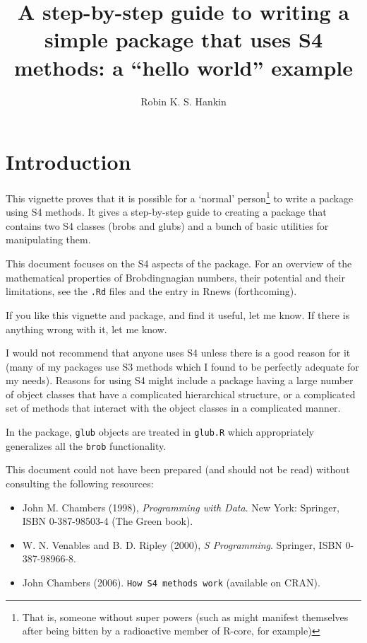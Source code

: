 \documentclass[a4paper]{article}
\author{Robin K. S. Hankin}
\title{A step-by-step guide to writing a simple package that uses S4 methods: a ``hello world'' example}
\begin{document}
\maketitle

\section{Introduction}

This vignette proves that it is possible for a `normal'
person\footnote{That is, someone without super powers (such as might
manifest themselves after being bitten by a radioactive member of
R-core, for example)} to write a package using S4 methods.  It gives a
step-by-step guide to creating a package that contains two S4 classes
(brobs and glubs) and a bunch of basic utilities for manipulating
them.

This document focuses on the S4 aspects of the package.  For an
overview of the mathematical properties of Brobdingnagian numbers,
their potential and their limitations, see the {\tt .Rd} files and the
entry in Rnews (forthcoming).

If you like this vignette and package, and find it useful, let me
know.  If there is anything wrong with it, let me know.

I would not recommend that anyone uses S4 unless there is a good
reason for it (many of my packages use S3 methods which I found to be
perfectly adequate for my needs).  Reasons for using S4 might include
a package having a large number of object classes that have a
complicated hierarchical structure, or a complicated set of methods
that interact with the object classes in a complicated manner.

In the package, {\tt glub} objects are treated in {\tt glub.R} which
appropriately generalizes all the {\tt brob} functionality.

This document could not have been prepared (and should not be read)
without consulting the following resources:
\begin{itemize}
\item John M. Chambers (1998), {\it Programming with Data}.  New York: Springer,
     ISBN 0-387-98503-4 (The Green book).
\item W. N. Venables and B. D. Ripley (2000), {\it S Programming}.  Springer,
     ISBN 0-387-98966-8.
\item John Chambers (2006).  {\tt How S4 methods work} (available on CRAN).
\end{itemize}
\end{document}
